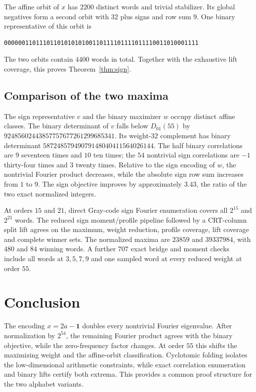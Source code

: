 \documentclass[11pt,a4paper]{article}
\theoremstyle{remark}
\begin{document}
The affine orbit of $x$ has $2200$ distinct words and trivial
stabilizer. Its global negatives form a second orbit with $32$
plus signs and row sum $9$. One binary representative of this orbit is
\begin{lstlisting}
0000001101110110101010100110111101111011110011010001111
\end{lstlisting}
The two orbits contain $4400$ words in total.
Together with the exhaustive lift coverage, this proves
Theorem~\ref{thm:sign}.


\subsection{Comparison of the two maxima}

The sign representative $v$ and the binary maximizer $w$
occupy distinct affine classes.  The binary determinant
of $v$ falls below $D_{01}(55)$ by
$92485602443857757677261299685341$. Its weight-$32$ complement has
binary determinant $58724857949079148040411564026144$.
The half binary correlations are $9$ seventeen times and $10$ ten times;
the $54$ nontrivial sign correlations are $-1$ thirty-four times and
$3$ twenty times. Relative to the sign encoding of $w$, the nontrivial
Fourier product decreases, while the absolute sign row sum
increases from $1$ to $9$. The sign objective improves by approximately
$3.43$, the ratio of the two exact normalized integers.

At orders $15$ and $21$, direct Gray-code sign Fourier enumeration
covers all $2^{15}$ and $2^{21}$ words. The reduced sign moment/profile
pipeline followed by a CRT-column split lift agrees on the maximum,
weight reduction, profile coverage, lift coverage and complete winner
sets. The normalized maxima are $23859$ and $39337984$, with $480$
and $84$ winning words. A further $707$ exact bridge and moment checks
include all words at $3,5,7,9$ and one sampled word at every reduced
weight at order $55$.


\section{Conclusion}

The encoding $x=2a-\mathbf1$ doubles every nontrivial
Fourier eigenvalue. After normalization by $2^{54}$,
the remaining Fourier product agrees with the binary
objective, while the zero-frequency factor changes.
At order $55$ this shifts the maximizing weight and
the affine-orbit classification. Cyclotomic folding isolates
the low-dimensional arithmetic constraints, while exact
correlation enumeration and binary lifts certify both extrema.
This provides a common proof structure for the two alphabet
variants.
\end{document}
